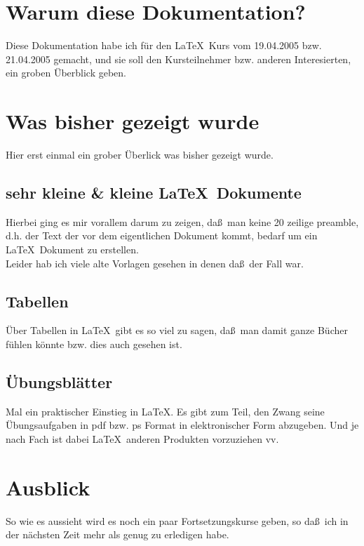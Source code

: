\documentclass[12pt,twoside,a4paper]{article}
\begin{document}
\section{Warum diese Dokumentation?}

Diese Dokumentation habe ich f\"ur den \LaTeX \ Kurs vom 19.04.2005 
bzw. 21.04.2005 
gemacht, und sie soll den Kursteilnehmer bzw. anderen Interesierten,
ein groben \"Uberblick geben. 

\section{Was bisher gezeigt wurde}

Hier erst einmal ein grober \"Uberlick was bisher gezeigt wurde. 

\subsection{sehr kleine \& kleine \LaTeX \ Dokumente}

Hierbei ging es mir vorallem darum zu zeigen, da\ss \ man keine
20 zeilige preamble, d.h. der Text der vor dem eigentlichen 
Dokument kommt, bedarf um ein \LaTeX \ Dokument zu erstellen. \\
Leider hab ich viele alte Vorlagen gesehen in denen da\ss \ der Fall war.

\subsection{Tabellen} 

\"Uber Tabellen in \LaTeX \ gibt es so viel zu sagen, da\ss \ man damit ganze 
B\"ucher f\"uhlen k\"onnte bzw. dies auch gesehen ist. 

\subsection{\"Ubungsbl\"atter}
Mal ein praktischer Einstieg in \LaTeX . Es gibt zum Teil, den Zwang seine 
\"Ubungsaufgaben in pdf bzw. ps Format in elektronischer Form abzugeben.
Und je nach Fach ist dabei \LaTeX \ anderen Produkten vorzuziehen vv.

\section{Ausblick}

So wie es aussieht wird es noch ein paar Fortsetzungskurse geben,
so da\ss \ ich in der n\"achsten Zeit mehr als genug zu erledigen habe.  
  
\end{document}
